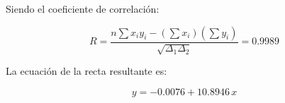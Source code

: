 \documentclass[letter,11pt]{article}
\begin{document}
Siendo el coeficiente de correlación:

\begin{equation*}
    R = \frac{n \sum x_i y_i - (\sum x_i)(\sum y_i)}{\sqrt{\Delta_1 \Delta_2}}
      = 0.9989
\end{equation*}
\vspace{0.10cm}

La ecuación de la recta resultante es:

\begin{equation*}
    y = -0.0076 + 10.8946\,x
\end{equation*}
\vspace{0.10cm}
\end{document}
